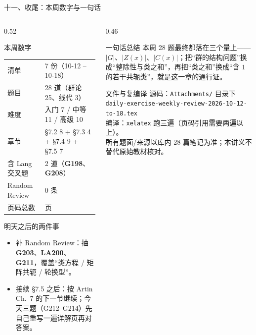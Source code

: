 \documentclass[aspectratio=169,10pt,fontset=none]{ctexbeamer}
\newcommand{\ex}[1]{\textcolor{accent}{\footnotesize\bfseries #1}}
\begin{document}
\begin{frame}[t]{十一、收尾：本周数字与一句话}
  \label{sec:closing}
  \begin{columns}[T,onlytextwidth]
    \begin{column}{0.52\textwidth}
      \begin{block}{\footnotesize 本周数字}
        \scriptsize
        \renewcommand{\arraystretch}{1.18}
        \begin{tabular}{@{}ll@{}}
          清单 & 7 份（10-12 -- 10-18）\\
          题目 & 28 道（群论 25、线代 3）\\
          难度 & 入门 7 / 中等 11 / 高级 10\\
          章节 & \S7.2 8 + \S7.3 4 + \S7.4 9 + \S7.5 7\\
          含 Lang 交叉题 & 2 道（\ex{G198}、\ex{G208}）\\
          Random Review & 0 条\\
          页码总数 & \inserttotalframenumber{} 页\\
        \end{tabular}
      \end{block}
      \begin{exampleblock}{\footnotesize 明天之后的两件事}
        \scriptsize
        \begin{itemize}\setlength{\itemsep}{1pt}
          \item 补 Random Review：抽 \ex{G203}、\ex{LA200}、\ex{G211}，覆盖“类方程 / 矩阵共轭 / 轮换型”。
          \item 接续 \S7.5 之后：按 Artin Ch.~7 的下一节继续；今天三题（G212--G214）先自己重写一遍详解页再对答案。
        \end{itemize}
      \end{exampleblock}
    \end{column}
    \begin{column}{0.46\textwidth}
      \begin{block}{\footnotesize 一句话总结}
        \scriptsize
        本周 28 题最终都落在三个量上——$|G|$、$|Z(x)|$、$|C(x)|$；把“群的结构问题”换成“整除性与类之和”，再把“类之和”换成“含 $1$ 的若干共轭类”，就是这一章的通行证。
      \end{block}
      \begin{block}{\footnotesize 文件与复编译}
        \scriptsize
        源码：\texttt{Attachments/} 目录下\\
        {\tiny\texttt{daily-exercise-weekly-review-2026-10-12-to-18.tex}}\\
        编译：\texttt{xelatex} 跑三遍（页码引用需要两遍以上）。\\
        所有题面/来源以库内 28 篇笔记为准；本讲义不替代原始教材核对。
      \end{block}
    \end{column}
  \end{columns}
\end{frame}
\end{document}

